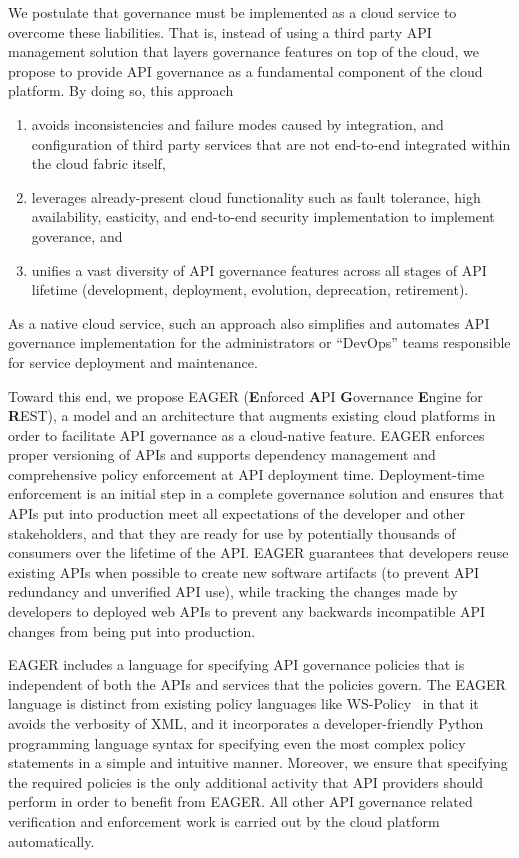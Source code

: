 We postulate that governance must be implemented as a cloud service to
overcome these liabilities.
That is, instead of using a third party API management
solution that layers governance features on top of the cloud, 
we propose to provide API governance as a fundamental component of the cloud
platform.  By doing so, this approach
\begin{enumerate}
\item avoids inconsistencies and failure modes caused  
by integration, and configuration of third party services that are not
end-to-end integrated within the cloud fabric itself, 
\item leverages already-present cloud functionality such as fault tolerance,
high availability, easticity, and end-to-end security implementation to
implement goverance, and
\item unifies a vast diversity of API
governance features across all stages of API lifetime
(development, deployment, evolution, deprecation, retirement). 
\end{enumerate}
As a native cloud service, such an
approach also simplifies and automates API governance implementation for
the administrators or ``DevOps'' teams responsible for service deployment and
maintenance.

Toward this end, we propose EAGER ({\bf E}nforced {\bf A}PI {\bf G}overnance
{\bf E}ngine for {\bf R}EST), 
a model and an architecture that augments existing
cloud platforms in order to facilitate API governance as a 
cloud-native feature. EAGER enforces proper versioning of APIs and supports dependency 
management and comprehensive policy enforcement at API deployment time. 
Deployment-time enforcement is an initial step in a complete governance
solution and ensures that APIs put into production meet all expectations of
the developer and other stakeholders, and that they are ready for use
by potentially thousands of consumers over the lifetime of the API.
EAGER guarantees that 
developers reuse existing APIs when possible to create new software artifacts
(to prevent API redundancy and unverified API use), while
tracking the changes made by developers to deployed web APIs to prevent
any backwards incompatible API changes from being put into production.

EAGER includes a language for specifying 
API governance policies that is independent of both the APIs and services that
the policies govern. 
The EAGER language is distinct from 
existing policy languages like WS-Policy~\cite{WSPolicy,soagovstandard}
in that it avoids the verbosity of XML, 
and it incorporates a developer-friendly Python programming language syntax for 
specifying even the most complex policy statements in a simple and 
intuitive manner. Moreover, we ensure that specifying the required policies 
is the only additional activity that API providers should perform in
order to benefit from EAGER. All other API governance related verification and 
enforcement work is carried out by the cloud platform automatically.

